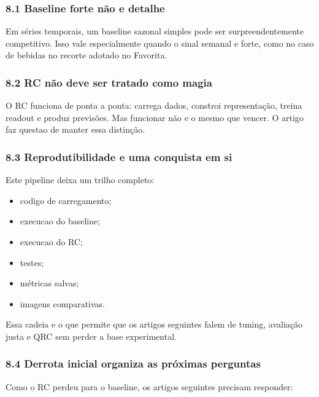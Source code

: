 \documentclass[12pt]{article}
\providecommand{\tightlist}{%
          \setlength{\itemsep}{0pt}\setlength{\parskip}{0pt}}
\begin{document}
\subsubsection{8.1 Baseline forte não e detalhe}\label{81-baseline-forte-nuxe3o-e-detalhe}

Em séries temporais, um baseline sazonal simples pode ser surpreendentemente competitivo. Isso vale especialmente quando o sinal semanal e forte, como no caso de bebidas no recorte adotado no Favorita.

\subsubsection{8.2 RC não deve ser tratado como magia}\label{82-rc-nuxe3o-deve-ser-tratado-como-magia}

O RC funciona de ponta a ponta: carrega dados, constroi representação, treina readout e produz previsões. Mas funcionar não e o mesmo que vencer. O artigo faz questao de manter essa distinção.

\subsubsection{8.3 Reprodutibilidade e uma conquista em si}\label{83-reprodutibilidade-e-uma-conquista-em-si}

Este pipeline deixa um trilho completo:

\begin{itemize}
\tightlist
\item
  codigo de carregamento;
\item
  execucao do baseline;
\item
  execucao do RC;
\item
  testes;
\item
  métricas salvas;
\item
  imagens comparativas.
\end{itemize}

Essa cadeia e o que permite que os artigos seguintes falem de tuning, avaliação justa e QRC sem perder a base experimental.

\subsubsection{8.4 Derrota inicial organiza as próximas perguntas}\label{84-derrota-inicial-organiza-as-pruxf3ximas-perguntas}

Como o RC perdeu para o baseline, os artigos seguintes precisam responder:
\end{document}

